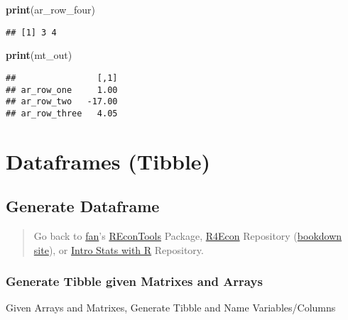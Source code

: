 \documentclass[
]{book}
\newenvironment{Shaded}{\begin{snugshade}}{\end{snugshade}}
\newcommand{\KeywordTok}[1]{\textcolor[rgb]{0.13,0.29,0.53}{\textbf{#1}}}
\newcommand{\NormalTok}[1]{#1}
\begin{document}
\begin{Shaded}
\begin{Highlighting}[]
\KeywordTok{print}\NormalTok{(ar_row_four)}
\end{Highlighting}
\end{Shaded}

\begin{verbatim}
## [1] 3 4
\end{verbatim}

\begin{Shaded}
\begin{Highlighting}[]
\KeywordTok{print}\NormalTok{(mt_out)}
\end{Highlighting}
\end{Shaded}

\begin{verbatim}
##                [,1]
## ar_row_one     1.00
## ar_row_two   -17.00
## ar_row_three   4.05
\end{verbatim}

\hypertarget{dataframes-tibble}{%
\section{Dataframes (Tibble)}\label{dataframes-tibble}}

\hypertarget{generate-dataframe}{%
\subsection{Generate Dataframe}\label{generate-dataframe}}

\begin{quote}
Go back to \href{http://fanwangecon.github.io/CodeDynaAsset/}{fan}'s \href{https://fanwangecon.github.io/REconTools/}{REconTools} Package, \href{https://fanwangecon.github.io/R4Econ/}{R4Econ} Repository (\href{https://fanwangecon.github.io/R4Econ/bookdown}{bookdown site}), or \href{https://fanwangecon.github.io/Stat4Econ/}{Intro Stats with R} Repository.
\end{quote}

\hypertarget{generate-tibble-given-matrixes-and-arrays}{%
\subsubsection{Generate Tibble given Matrixes and Arrays}\label{generate-tibble-given-matrixes-and-arrays}}

Given Arrays and Matrixes, Generate Tibble and Name Variables/Columns
\end{document}
